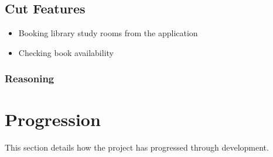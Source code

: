 \documentclass{article}
\begin{document}
	\subsection{Cut Features}
		\begin{itemize}
			\item Booking library study rooms from the application 
			\item Checking book availability
		\end{itemize}
	
		\subsubsection{Reasoning}

\section{Progression}	
	This section details how the project has progressed through development.
\end{document}
